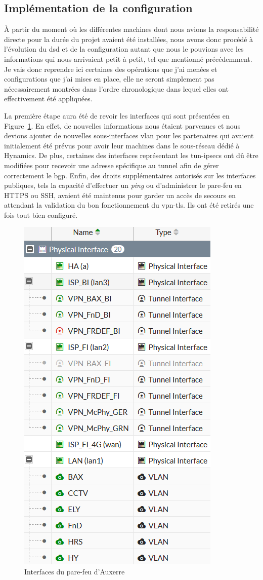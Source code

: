 \documentclass[12pt, oneside, a4paper, titlepage]{report}
\begin{document}
\subsection{Implémentation de la configuration}%
\label{sub:mission::main::implem}

À partir du moment où les différentes machines dont nous avions la
responsabilité directe pour la durée du projet avaient été installées, nous
avons donc procédé à l'évolution du \gls{dsd} et de la configuration autant que
nous le pouvions avec les informations qui nous arrivaient petit à petit, tel
que mentionné précédemment. Je vais donc reprendre ici certaines des opérations
que j'ai menées et configurations que j'ai mises en place, elle ne seront
simplement pas nécessairement montrées dans l'ordre chronologique dans lequel
elles ont effectivement été appliquées.

La première étape aura été de revoir les interfaces qui sont présentées en
Figure~\ref{fig:fgt-auxr/interfaces}. En effet, de nouvelles informations nous
étaient parvenues et nous devions ajouter de nouvelles sous-interfaces
\gls{vlan} pour les partenaires qui avaient initialement été prévus pour avoir
leur machines dans le sous-réseau dédié à Hynamics. De plus, certaines des
interfaces représentant les \glspl{tun-ipsec} ont dû être modifiées pour
recevoir une adresse spécifique au tunnel afin de gérer correctement le
\gls{bgp}. Enfin, des droits supplémentaires autorisés sur les interfaces
publiques, tels la capacité d'effectuer un \textit{ping} ou d'administrer le
pare-feu en HTTPS ou SSH, avaient été maintenus pour garder un accès de secours
en attendant la validation du bon fonctionnement du \gls{vpn-tls}. Ils ont été
retirés une fois tout bien configuré.

\begin{figure}[h!]
    \centering
    \includegraphics[width = 0.5\linewidth]{img/fgt-auxr/interfaces.png}
    \caption{Interfaces du pare-feu d'Auxerre}%
    \label{fig:fgt-auxr/interfaces}
\end{figure}
\end{document}
